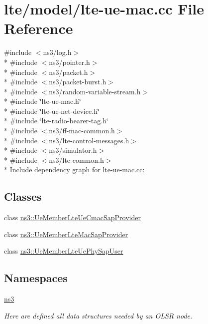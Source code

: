 \hypertarget{lte-ue-mac_8cc}{}\section{lte/model/lte-\/ue-\/mac.cc File Reference}
\label{lte-ue-mac_8cc}
{\ttfamily \#include $<$ns3/log.\+h$>$}\\*
{\ttfamily \#include $<$ns3/pointer.\+h$>$}\\*
{\ttfamily \#include $<$ns3/packet.\+h$>$}\\*
{\ttfamily \#include $<$ns3/packet-\/burst.\+h$>$}\\*
{\ttfamily \#include $<$ns3/random-\/variable-\/stream.\+h$>$}\\*
{\ttfamily \#include \char`\"{}lte-\/ue-\/mac.\+h\char`\"{}}\\*
{\ttfamily \#include \char`\"{}lte-\/ue-\/net-\/device.\+h\char`\"{}}\\*
{\ttfamily \#include \char`\"{}lte-\/radio-\/bearer-\/tag.\+h\char`\"{}}\\*
{\ttfamily \#include $<$ns3/ff-\/mac-\/common.\+h$>$}\\*
{\ttfamily \#include $<$ns3/lte-\/control-\/messages.\+h$>$}\\*
{\ttfamily \#include $<$ns3/simulator.\+h$>$}\\*
{\ttfamily \#include $<$ns3/lte-\/common.\+h$>$}\\*
Include dependency graph for lte-\/ue-\/mac.cc\+:
\subsection*{Classes}
\begin{DoxyCompactItemize}
\item 
class \hyperlink{classns3_1_1UeMemberLteUeCmacSapProvider}{ns3\+::\+Ue\+Member\+Lte\+Ue\+Cmac\+Sap\+Provider}
\item 
class \hyperlink{classns3_1_1UeMemberLteMacSapProvider}{ns3\+::\+Ue\+Member\+Lte\+Mac\+Sap\+Provider}
\item 
class \hyperlink{classns3_1_1UeMemberLteUePhySapUser}{ns3\+::\+Ue\+Member\+Lte\+Ue\+Phy\+Sap\+User}
\end{DoxyCompactItemize}
\subsection*{Namespaces}
\begin{DoxyCompactItemize}
\item 
 \hyperlink{namespacens3}{ns3}
\begin{DoxyCompactList}\small\item\em Here are defined all data structures needed by an O\+L\+SR node. \end{DoxyCompactList}\end{DoxyCompactItemize}
